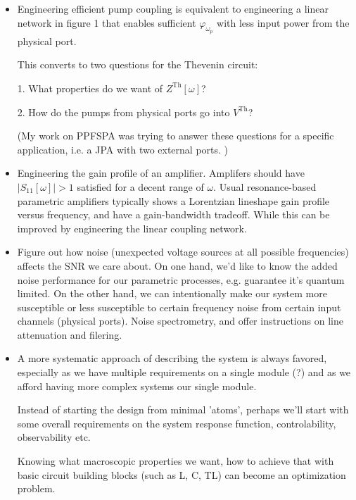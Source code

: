 \documentclass{article}
\newcommand{\Th}{\mathrm{Th}}
\begin{document}
\begin{itemize}
	\item Engineering efficient pump coupling is equivalent to engineering a linear network in figure 1 that enables sufficient $\varphi_{\omega_p}$ with less input power from the physical port. 

This converts to two questions for the Thevenin circuit: 

1. What properties do we want of $Z^\Th[\omega]$? 

2. How do the pumps from physical ports go into $V^\Th$? 

(My work on PPFSPA was trying to answer these questions for a specific application, i.e. a JPA with two external ports. )

\item Engineering the gain profile of an amplifier. Amplifers should have $|S_{11}[\omega]| > 1$ satisfied for a decent range of $\omega$. Usual resonance-based parametric amplifiers typically shows a Lorentzian lineshape gain profile versus frequency, and have a gain-bandwidth tradeoff. While this can be improved by engineering the linear coupling network. 


\item Figure out how noise (unexpected voltage sources at all possible frequencies) affects the SNR we care about. On one hand, we'd like to know the added noise performance for our parametric processes, e.g. guarantee it's quantum limited. On the other hand, we can intentionally make our system more susceptible or less susceptible to certain frequency noise from certain input channels (physical ports). Noise spectrometry, and offer instructions on line attenuation and filering. 

\item A more systematic approach of describing the system is always favored, especially as we have multiple requirements on a single module (?) and as we afford having more complex systems our single module. 

Instead of starting the design from minimal 'atoms', perhaps we'll start with some overall requirements on the system response function, controlability, observability etc. 

Knowing what macroscopic properties we want, how to achieve that with basic circuit building blocks (such as L, C, TL) can become an optimization problem. 

\end{itemize}
\end{document}
